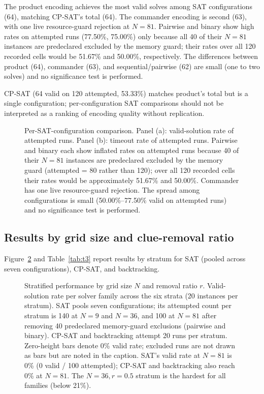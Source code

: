 \documentclass[a4paper,fleqn]{cas-sc}
\begin{document}
The product encoding achieves the most valid solves among SAT configurations (64), matching CP-SAT's total (64). The commander encoding is second (63), with one live resource-guard rejection at \(N=81\). Pairwise and binary show high rates on attempted runs (77.50\%, 75.00\%) only because all 40 of their \(N=81\) instances are predeclared excluded by the memory guard; their rates over all 120 recorded cells would be 51.67\% and 50.00\%, respectively. The differences between product (64), commander (63), and sequential/pairwise (62) are small (one to two solves) and no significance test is performed.

CP-SAT (64 valid on 120 attempted, 53.33\%) matches product's total but is a single configuration; per-configuration SAT comparisons should not be interpreted as a ranking of encoding quality without replication.

\begin{figure}[htbp]
\centering

\caption{Per-SAT-configuration comparison. Panel (a): valid-solution rate of attempted runs. Panel (b): timeout rate of attempted runs. Pairwise and binary each show inflated rates on attempted runs because 40 of their \(N=81\) instances are predeclared excluded by the memory guard (attempted = 80 rather than 120); over all 120 recorded cells their rates would be approximately 51.67\% and 50.00\%. Commander has one live resource-guard rejection. The spread among configurations is small (50.00\%--77.50\% valid on attempted runs) and no significance test is performed.}
\label{fig:satconfigs}
\end{figure}

\subsection{Results by grid size and clue-removal ratio}\label{sec:strata}

Figure~\ref{fig:stratified} and Table~\ref{tab:t3} report results by stratum for SAT (pooled across seven configurations), CP-SAT, and backtracking.

\begin{figure}[htbp]
\centering

\caption{Stratified performance by grid size \(N\) and removal ratio \(r\). Valid-solution rate per solver family across the six strata (20 instances per stratum). SAT pools seven configurations; its attempted count per stratum is 140 at \(N=9\) and \(N=36\), and 100 at \(N=81\) after removing 40 predeclared memory-guard exclusions (pairwise and binary). CP-SAT and backtracking attempt 20 runs per stratum. Zero-height bars denote 0\% valid rate; excluded runs are not drawn as bars but are noted in the caption. SAT's valid rate at \(N=81\) is 0\% (0 valid / 100 attempted); CP-SAT and backtracking also reach 0\% at \(N=81\). The \(N=36, r=0.5\) stratum is the hardest for all families (below 21\%).}
\label{fig:stratified}
\end{figure}
\end{document}
